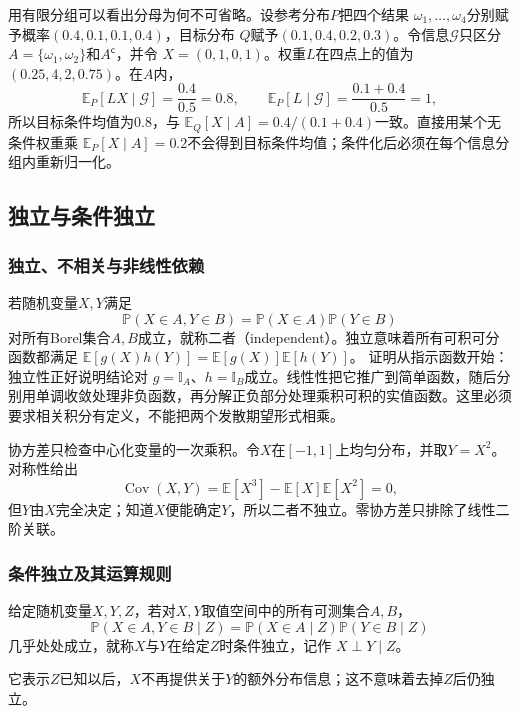 用有限分组可以看出分母为何不可省略。设参考分布\(P\)把四个结果
\(\omega_1,\ldots,\omega_4\)分别赋予概率\((0.4,0.1,0.1,0.4)\)，目标分布
\(Q\)赋予\((0.1,0.4,0.2,0.3)\)。令信息\(\mathcal{G}\)只区分
\(A=\{\omega_1,\omega_2\}\)和\(A^{\mathsf c}\)，并令
\(X=(0,1,0,1)\)。权重\(L\)在四点上的值为\((0.25,4,2,0.75)\)。在\(A\)内，
\[
  \mathbb{E}_P[LX\mid\mathcal{G}]
  =\frac{0.4}{0.5}=0.8,\qquad
  \mathbb{E}_P[L\mid\mathcal{G}]
  =\frac{0.1+0.4}{0.5}=1,
\]
所以目标条件均值为\(0.8\)，与
\(\mathbb{E}_Q[X\mid A]=0.4/(0.1+0.4)\)一致。直接用某个无条件权重乘
\(\mathbb{E}_P[X\mid A]=0.2\)不会得到目标条件均值；条件化后必须在每个信息分组内重新归一化。

\subsection{独立与条件独立}
\label{sec:probability-moments-independence}

\subsubsection{独立、不相关与非线性依赖}

若随机变量\(X,Y\)满足
\[ \mathbb{P}(X\in A,Y\in B)
  =\mathbb{P}(X\in A)\mathbb{P}(Y\in B) \]
对所有Borel集合\(A,B\)成立，就称二者（independent）。独立意味着所有可积可分函数都满足
\(\mathbb{E}[g(X)h(Y)]=\mathbb{E}[g(X)]\mathbb{E}[h(Y)]\)。
证明从指示函数开始：独立性正好说明结论对
\(g=\mathbb{I}_A\)、\(h=\mathbb{I}_B\)成立。线性性把它推广到简单函数，随后分别用单调收敛处理非负函数，再分解正负部分处理乘积可积的实值函数。这里必须要求相关积分有定义，不能把两个发散期望形式相乘。

协方差只检查中心化变量的一次乘积。令\(X\)在\([-1,1]\)上均匀分布，并取\(Y=X^2\)。对称性给出
\[ \operatorname{Cov}(X,Y)
  =\mathbb{E}[X^3]-\mathbb{E}[X]\mathbb{E}[X^2]=0, \]
但\(Y\)由\(X\)完全决定；知道\(X\)便能确定\(Y\)，所以二者不独立。零协方差只排除了线性二阶关联。

\subsubsection{条件独立及其运算规则}

\begin{definition}[条件独立]
  \label{def:probability-conditional-independence}
  给定随机变量\(X,Y,Z\)，若对\(X,Y\)取值空间中的所有可测集合\(A,B\)，
\[ \mathbb{P}(X\in A,Y\in B\mid Z)
  =\mathbb{P}(X\in A\mid Z)\mathbb{P}(Y\in B\mid Z) \]
几乎处处成立，就称\(X\)与\(Y\)在给定\(Z\)时条件独立，记作
\(X\perp Y\mid Z\)。
\end{definition}
它表示\(Z\)已知以后，\(X\)不再提供关于\(Y\)的额外分布信息；这不意味着去掉\(Z\)后仍独立。

